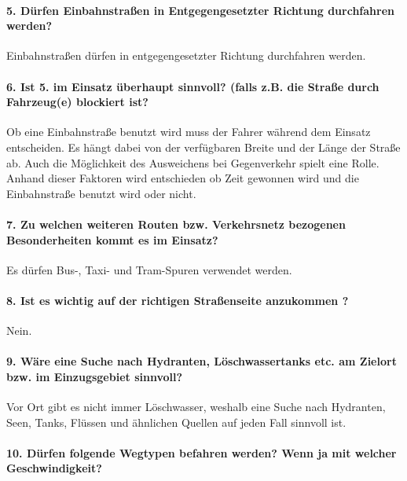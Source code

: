 \documentclass[12pt,a4paper]{article}
\begin{document}
\paragraph*{5. Dürfen Einbahnstraßen in Entgegengesetzter Richtung durchfahren werden?}
\label{frage5}

Einbahnstraßen dürfen in entgegengesetzter Richtung durchfahren werden.

\paragraph*{6. Ist 5. im Einsatz überhaupt sinnvoll? (falls z.B. die Straße durch Fahrzeug(e) blockiert ist?}
\label{frage6}

Ob eine Einbahnstraße benutzt wird muss der Fahrer während dem Einsatz entscheiden. Es hängt dabei von der verfügbaren Breite und der Länge der Straße ab. Auch die Möglichkeit des Ausweichens bei Gegenverkehr spielt eine Rolle. Anhand dieser Faktoren wird entschieden ob Zeit gewonnen wird und die Einbahnstraße benutzt wird oder nicht.

\paragraph*{7. Zu welchen weiteren Routen bzw. Verkehrsnetz bezogenen Besonderheiten kommt es im Einsatz?}
\label{frage7}

Es dürfen Bus-, Taxi- und Tram-Spuren verwendet werden.

\paragraph*{8. Ist es wichtig auf der richtigen Straßenseite anzukommen ?}

Nein.

\paragraph*{9. Wäre eine Suche nach Hydranten, Löschwassertanks etc. am Zielort bzw. im Einzugsgebiet sinnvoll?}
\label{frage9}

Vor Ort gibt es nicht immer Löschwasser, weshalb eine Suche nach Hydranten, Seen, Tanks, Flüssen und ähnlichen Quellen auf jeden Fall sinnvoll ist.

\paragraph*{10. Dürfen folgende Wegtypen befahren werden? Wenn ja mit welcher Geschwindigkeit?}
\label{frage10}
\end{document}
